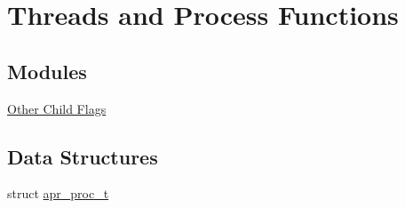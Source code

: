\hypertarget{group__apr__thread__proc}{\section{Threads and Process Functions}
\label{group__apr__thread__proc}
}
\subsection*{Modules}
\begin{DoxyCompactItemize}
\item 
\hyperlink{group___a_p_r___o_c}{Other Child Flags}
\end{DoxyCompactItemize}
\subsection*{Data Structures}
\begin{DoxyCompactItemize}
\item 
struct \hyperlink{structapr__proc__t}{apr\-\_\-proc\-\_\-t}
\end{DoxyCompactItemize}
